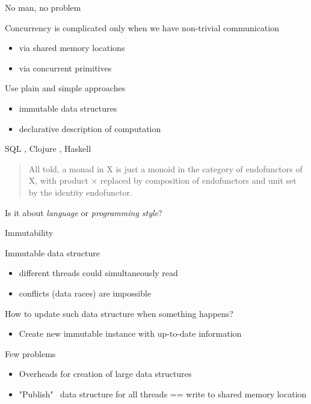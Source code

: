 \begin{frame}[fragile, t]{No man, no problem}

Concurrency is complicated only when we have non-trivial communication
\begin{itemize}
  \item via shared memory locations
  \item via concurrent primitives
\end{itemize}

\pause

Use plain and simple approaches

\begin{itemize}
  \pause \item immutable data structures
  \pause \item declarative description of computation
\end{itemize}

\pause SQL \pause , Clojure \pause , Haskell

\pause
\begin{quote}
All told, a monad in X is just a monoid in the category of endofunctors of X, with product × replaced by composition of endofunctors and unit set by the identity endofunctor.
\end{quote}

\pause
Is it about \textit{language} or \textit{programming style}?
\end{frame}

\begin{frame}[fragile, t]{Immutability}

Immutable data structure
\begin{itemize}
  \pause \item different threads could simultaneously read
  \pause \item conflicts (data races) are impossible
\end{itemize}

\pause
How to update such data structure when something happens?
\begin{itemize}
  \pause \item Create new immutable instance with up-to-date information
\end{itemize}

\pause
Few problems
\begin{itemize}
  \pause \item Overheads for creation of large data structures
  \pause \item "Publish" \ data structure for all threads  == write to shared memory location
\end{itemize}

\end{frame}

